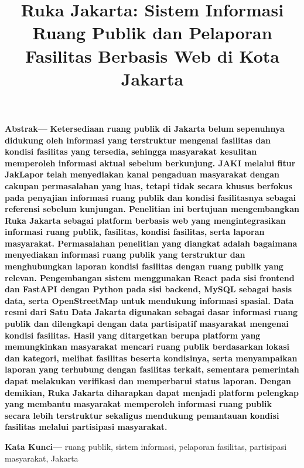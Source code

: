 \documentclass[conference]{IEEEtran}
\begin{document}
\title{
Ruka Jakarta: Sistem Informasi Ruang Publik dan Pelaporan Fasilitas Berbasis Web di Kota Jakarta
}


\maketitle

\noindent\textbf{Abstrak—}
\textbf{Ketersediaan ruang publik di Jakarta belum sepenuhnya didukung oleh informasi yang terstruktur mengenai fasilitas dan kondisi fasilitas yang tersedia, sehingga masyarakat kesulitan memperoleh informasi aktual sebelum berkunjung. JAKI melalui fitur JakLapor telah menyediakan kanal pengaduan masyarakat dengan cakupan permasalahan yang luas, tetapi tidak secara khusus berfokus pada penyajian informasi ruang publik dan kondisi fasilitasnya sebagai referensi sebelum kunjungan. Penelitian ini bertujuan mengembangkan Ruka Jakarta sebagai platform berbasis web yang mengintegrasikan informasi ruang publik, fasilitas, kondisi fasilitas, serta laporan masyarakat. Permasalahan penelitian yang diangkat adalah bagaimana menyediakan informasi ruang publik yang terstruktur dan menghubungkan laporan kondisi fasilitas dengan ruang publik yang relevan. Pengembangan sistem menggunakan React pada sisi frontend dan FastAPI dengan Python pada sisi backend, MySQL sebagai basis data, serta OpenStreetMap untuk mendukung informasi spasial. Data resmi dari Satu Data Jakarta digunakan sebagai dasar informasi ruang publik dan dilengkapi dengan data partisipatif masyarakat mengenai kondisi fasilitas. Hasil yang ditargetkan berupa platform yang memungkinkan masyarakat mencari ruang publik berdasarkan lokasi dan kategori, melihat fasilitas beserta kondisinya, serta menyampaikan laporan yang terhubung dengan fasilitas terkait, sementara pemerintah dapat melakukan verifikasi dan memperbarui status laporan. Dengan demikian, Ruka Jakarta diharapkan dapat menjadi platform pelengkap yang membantu masyarakat memperoleh informasi ruang publik secara lebih terstruktur sekaligus mendukung pemantauan kondisi fasilitas melalui partisipasi masyarakat.}

\vspace{0.5em}

\noindent\textbf{Kata Kunci—}
ruang publik, sistem informasi, pelaporan fasilitas, partisipasi masyarakat, Jakarta
\end{document}
